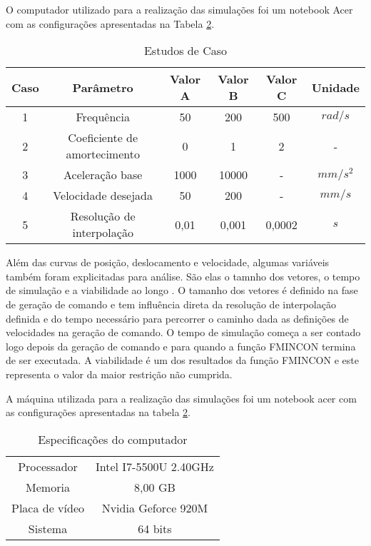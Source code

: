 O computador utilizado para a realização das simulações foi um notebook Acer com as configurações apresentadas na Tabela
\ref{tab:note_config}.

\begin{table}
    \begin{center}
    \caption{Estudos de Caso}
    \label{tab:sim_params}
    \begin{tabular}{c c c c c c}
        Caso & Parâmetro & Valor A & Valor B & Valor C & Unidade\\ \hline
        1 & Frequência & 50 & 200 & 500 & $rad/s$\\
        2 & Coeficiente de amortecimento & 0 & 1 & 2 & - \\
        3 & Aceleração base & 1000 & 10000 & - & $mm/s^2$ \\
        4 & Velocidade desejada & 50 & 200 & - & $mm/s$ \\
        5 & Resolução de interpolação & 0,01 & 0,001 & 0,0002 & $s$ \\ \hline
    \end{tabular}
    \end{center}
\end{table}

Além das curvas de posição, deslocamento e velocidade, algumas variáveis também foram explicitadas para análise.
São elas o tamnho dos vetores, o tempo de simulação e a viabilidade ao longo .
O tamanho dos vetores é definido na fase de geração de comando e tem influência direta da resolução de interpolação definida e
do tempo necessário para percorrer o caminho dada as definições de velocidades na geração de comando.
O tempo de simulação começa a ser contado logo depois da geração de comando e para quando a função FMINCON
termina de ser executada.
A viabilidade é um dos resultados da função FMINCON e este representa o valor da maior restrição não cumprida.

A máquina utilizada para a realização das simulações foi um notebook acer com as configurações apresentadas na tabela
\ref{tab:note_config}.

\begin{table}
    \begin{center}
    \caption{Especificações do computador}
    \label{tab:note_config}
    \begin{tabular}{c c}
        \hline
        Processador & Intel I7-5500U 2.40GHz \\
        Memoria & 8,00 GB \\
        Placa de vídeo & Nvidia Geforce 920M \\
        Sistema & 64 bits \\ \hline
    \end{tabular}
    \end{center}
\end{table}
